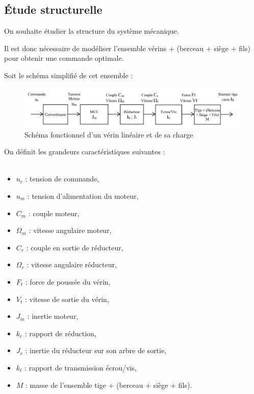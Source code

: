 \subsection{Étude structurelle}

On souhaite étudier la structure du système mécanique.

Il est donc nécessaire de modéliser l’ensemble \og vérins + (berceau + siège + fils) \fg pour obtenir une commande optimale.

Soit le schéma simplifié de cet ensemble :

\begin{figure}[!h]
\centering\includegraphics[width=0.8\linewidth]{img/fig18}
 \caption{Schéma fonctionnel d’un vérin linéaire et de sa charge}
 \label{img18}
\end{figure}

On définit les grandeurs caractéristiques suivantes : \\ ~\ 

\begin{minipage}{0.48\linewidth}
\begin{itemize}
 \item $u_c$ : tension de commande,
 \item $u_m$ : tension d’alimentation du moteur,
 \item $C_m$ : couple moteur,
 \item $\Omega_m$ : vitesse angulaire moteur,
 \item $C_r$ : couple en sortie de réducteur,
 \item $\Omega_r$ : vitesse angulaire réducteur,
 \item $F_t$ : force de poussée du vérin,
 \item $V_t$ : vitesse de sortie du vérin,
\end{itemize}
\end{minipage}\hfill
\begin{minipage}{0.48\linewidth}
\begin{itemize}
 \item $J_m$ : inertie moteur,
 \item $k_r$ : rapport de réduction,
 \item $J_r$ : inertie du réducteur sur son arbre de sortie,
 \item $k_t$ : rapport de transmission écrou/vis,
 \item $M$ : masse de l’ensemble tige + (berceau + siège
+ fils).
\end{itemize}
\end{minipage}

